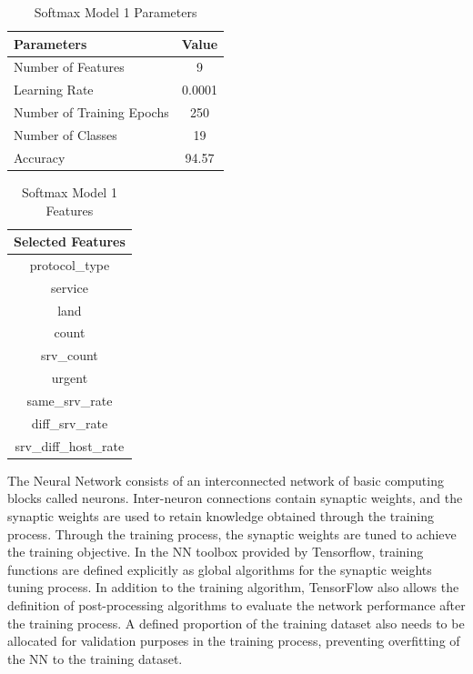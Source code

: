 \documentclass[12pt]{article}
\theoremstyle{definition}
\begin{document}
			\begin{table}[h!]
				\centering
				\caption{Softmax Model 1 Parameters}
				\label{tab:model-1-params}
				\begin{tabular}{|l|c|}
					\hline
					\bfseries{Parameters} & \textbf{Value} \\ \hline
					Number of Features & 9 \\
					Learning Rate & 0.0001 \\
					Number of Training Epochs & 250 \\
					Number of Classes & 19 \\ 
					Accuracy & 94.57 \\
					\hline	
				\end{tabular}
				
			\end{table}
		
			\begin{table}[h!]
				\centering
				\caption{Softmax Model 1 Features}
				\label{tab:model-1-features}
				\begin{tabular}{|c|}
					\hline
					\bfseries{Selected Features} \\ \hline
					protocol\_type \\
					service \\
					land \\
					count \\
					srv\_count \\
					urgent \\
					same\_srv\_rate \\
					diff\_srv\_rate \\
					srv\_diff\_host\_rate \\
					\hline	
				\end{tabular}
				
			\end{table}
		The Neural Network consists of an interconnected network of basic computing blocks called
		neurons. Inter-neuron connections contain synaptic weights, and the synaptic weights are
		used to retain knowledge obtained through the training process. Through the training
		process, the synaptic weights are tuned to achieve the training objective. In the NN
		toolbox provided by Tensorflow, training functions are defined explicitly as global
		algorithms for the synaptic weights tuning process. In addition to the training algorithm,
		TensorFlow also allows the definition of post-processing algorithms to evaluate the
		network performance after the training process. A defined proportion of the training
		dataset also needs to be allocated for validation purposes in the training process,
		preventing overfitting of the NN to the training dataset.
\end{document}
